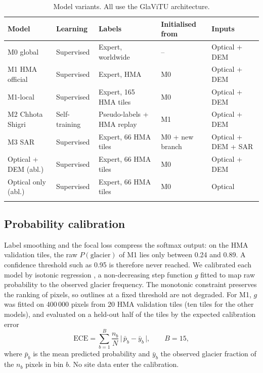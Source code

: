 \documentclass[pdflatex,sn-mathphys-num]{sn-jnl}%
\theoremstyle{thmstyleone}%
\theoremstyle{thmstyletwo}%
\theoremstyle{thmstylethree}%
\begin{document}
\begin{table}[h]
\caption{Model variants. All use the GlaViTU architecture.}\label{tab:models}%
\begin{tabular}{@{}p{2.3cm}p{1.6cm}p{2.9cm}p{2.1cm}p{2.3cm}@{}}
\toprule
Model & Learning & Labels & Initialised from & Inputs \\
\midrule
M0 global & Supervised\footnotemark[1] & Expert, worldwide & -- & Optical + DEM \\
M1 HMA official & Supervised\footnotemark[1] & Expert, HMA & M0 & Optical + DEM \\
M1-local & Supervised & Expert, 165 HMA tiles & M0 & Optical + DEM \\
M2 Chhota Shigri & Self-training & Pseudo-labels + HMA replay & M1 & Optical + DEM \\
M3 SAR & Supervised & Expert, 66 HMA tiles & M0 + new branch & Optical + DEM + SAR \\
Optical + DEM (abl.) & Supervised & Expert, 66 HMA tiles & M0 & Optical + DEM \\
Optical only (abl.) & Supervised & Expert, 66 HMA tiles & M0 & Optical \\
\botrule
\end{tabular}
\end{table}

\subsection{Probability calibration}\label{subsec3.5}

Label smoothing and the focal loss compress the softmax output: on the HMA validation tiles, the raw $P(\mathrm{glacier})$ of M1 lies only between 0.24 and 0.89. A confidence threshold such as 0.95 is therefore never reached. We calibrated each model by isotonic regression \cite{zadrozny2002}, a non-decreasing step function $g$ fitted to map raw probability to the observed glacier frequency. The monotonic constraint preserves the ranking of pixels, so outlines at a fixed threshold are not degraded. For M1, $g$ was fitted on 400\,000 pixels from 20 HMA validation tiles (ten tiles for the other models), and evaluated on a held-out half of the tiles by the expected calibration error \cite{naeini2015,guo2017}
\begin{equation}
\mathrm{ECE} = \sum_{b=1}^{B} \frac{n_b}{N}\,\bigl|\,\bar{p}_b - \bar{y}_b\,\bigr|, \qquad B = 15,\label{eq:ece}
\end{equation}
where $\bar{p}_b$ is the mean predicted probability and $\bar{y}_b$ the observed glacier fraction of the $n_b$ pixels in bin $b$. No site data enter the calibration.
\end{document}
